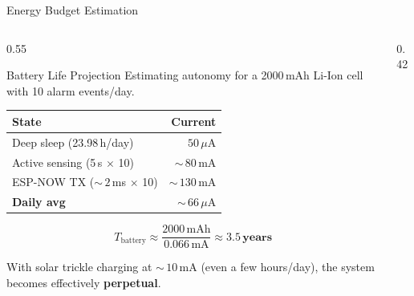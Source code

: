 \begin{frame}{Energy Budget Estimation}
\begin{columns}[T,onlytextwidth]
\begin{column}{0.55\textwidth}
\begin{block}{Battery Life Projection}
Estimating autonomy for a 2000\,mAh Li-Ion cell with 10 alarm events/day.
\end{block}
\vspace{0.2cm}
\renewcommand{\arraystretch}{1.2}
\centering
\begin{tabular}{lr}
\hline
\textbf{State} & \textbf{Current} \\
\hline
Deep sleep (23.98\,h/day) & $50\,\mu$A \\
Active sensing (5\,s $\times$ 10) & ${\sim}\,80$\,mA \\
ESP-NOW TX (${\sim}\,2$\,ms $\times$ 10) & ${\sim}\,130$\,mA \\
\hline
\textbf{Daily avg} & ${\sim}\,66\,\mu$A \\
\hline
\end{tabular}
\renewcommand{\arraystretch}{1.0}

\vspace{0.3cm}
$$T_\text{battery} \approx \frac{2000\,\text{mAh}}{0.066\,\text{mA}} \approx \mathbf{3.5\,\text{years}}$$

{\small With solar trickle charging at ${\sim}\,10$\,mA (even a few hours/day), the system becomes effectively \textbf{perpetual}.}
\end{column}
\begin{column}{0.42\textwidth}
\centering
{}
\end{column}
\end{columns}
\end{frame}
